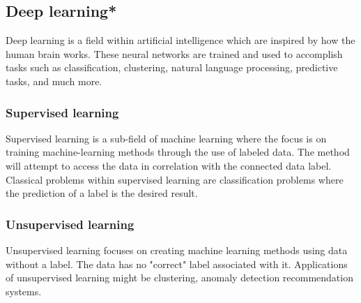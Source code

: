 \subsection{Deep learning*}

Deep learning is a field within artificial intelligence which are inspired by how the human brain works.
These neural networks are trained and used to accomplish tasks such as classification, clustering, natural language processing, predictive tasks, and much more.

\subsubsection{Supervised learning}
Supervised learning is a sub-field of machine learning where the focus is on training
machine-learning methods through the use of labeled data.
The method will attempt to access the data in correlation with the connected data label.
Classical problems within supervised learning are classification problems where the prediction of a label is the desired result.

\subsubsection{Unsupervised learning}
Unsupervised learning focuses on creating machine learning methods using data without a label.
The data has no "correct" label associated with it.
Applications of unsupervised learning might be clustering, anomaly detection recommendation systems.

